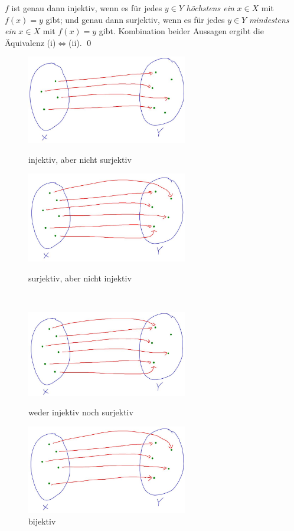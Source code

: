 \begin{bew}
    $f$ ist genau dann injektiv, wenn es für jedes $y\in Y$ \emph{höchstens ein} $x\in X$ mit $f(x)=y$ gibt; und genau dann surjektiv, wenn es für jedes $y\in Y$ \emph{mindestens ein} $x\in X$ mit $f(x)=y$ gibt. Kombination beider Aussagen ergibt die Äquivalenz (i)$\Leftrightarrow$(ii). \qed
\end{bew}


\begin{figure}[ht]
    \begin{minipage}{.48\textwidth}
        \includegraphics[width=7cm]{./_img/injsur4.jpeg}
        \centering \caption{injektiv, aber nicht surjektiv}
    \end{minipage}
    \quad
    \begin{minipage}{.48\textwidth}
        \includegraphics[width=7cm]{./_img/injsur2.jpeg}
        \centering \caption{surjektiv, aber nicht injektiv}
    \end{minipage}
    \quad\\[1em]
    \begin{minipage}{.48\textwidth}
        \includegraphics[width=7cm]{./_img/injsur1.jpeg}
        \centering \caption{weder injektiv noch surjektiv}
    \end{minipage}
    \quad
    \begin{minipage}{.48\textwidth}
        \includegraphics[width=7cm]{./_img/injsur3.jpeg}
        \centering \caption{bijektiv}
    \end{minipage}
\end{figure}


